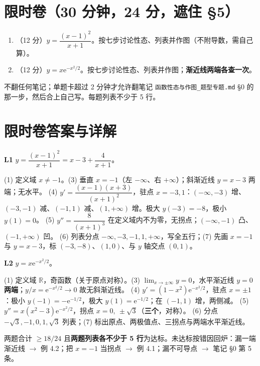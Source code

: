 \documentclass[11pt,a4paper]{ctexart}
\newcommand{\ee}{\mathrm{e}}
\begin{document}
\section{限时卷（30 分钟，24 分，遮住 \S 5）}

\begin{enumerate}[label=\textbf{L\arabic*.},leftmargin=2.4em,itemsep=10pt]
\item（12 分）$y=\dfrac{(x-1)^2}{x+1}$。按七步讨论性态、列表并作图（不附导数，需自己算）。
\item（12 分）$y=x\ee^{-x^2/2}$。按七步讨论性态、列表并作图；\textbf{渐近线两端各查一次}。
\end{enumerate}

\begin{warnbox}[掐表规则]
不翻任何笔记；单题卡超过 2 分钟才允许翻笔记 \texttt{函数性态与作图\_题型专题.md} \S 0 的那一步，然后合上自己写。每题列表不少于 5 行。
\end{warnbox}

\section{限时卷答案与详解}

\textbf{L1} $y=\dfrac{(x-1)^2}{x+1}=x-3+\dfrac4{x+1}$。

(1) 定义域 $x\ne-1$。(3) 垂直 $x=-1$（左 $-\infty$、右 $+\infty$）；斜渐近线 $y=x-3$ 两端；无水平。
(4) $y'=\dfrac{(x-1)(x+3)}{(x+1)^2}$，驻点 $x=-3,1$：$(-\infty,-3)$ 增、$(-3,-1)$ 减、$(-1,1)$ 减、$(1,+\infty)$ 增。极大 $y(-3)=-8$，极小 $y(1)=0$。
(5) $y''=\dfrac{8}{(x+1)^3}$ 在定义域内不为零，无拐点；$(-\infty,-1)$ 凸、$(-1,+\infty)$ 凹。
(6) 列表分点 $-\infty,-3,-1,1,+\infty$，写全五行；(7) 先画 $x=-1$ 与 $y=x-3$，标 $(-3,-8)$、$(1,0)$、与 $y$ 轴交点 $(0,1)$。

\textbf{L2} $y=x\ee^{-x^2/2}$。

(1) 定义域 $\mathbb{R}$，奇函数（关于原点对称）。(3) $\lim_{x\to\pm\infty}y=0$，水平渐近线 $y=0$ \textbf{两端}；$y/x=\ee^{-x^2/2}\to0$ 故无斜渐近线。
(4) $y'=(1-x^2)\ee^{-x^2/2}$，驻点 $x=\pm1$：极小 $y(-1)=-\ee^{-1/2}$，极大 $y(1)=\ee^{-1/2}$；在 $(-1,1)$ 增，两侧减。
(5) $y''=x(x^2-3)\ee^{-x^2/2}$，拐点 $x=0,\ \pm\sqrt3$（\textbf{三个}，对称）。
(6) 分点 $-\sqrt3,-1,0,1,\sqrt3$ 列表；(7) 标出原点、两极值点、三拐点与两端水平渐近线。

\begin{warnbox}[验收线]
两题合计 $\ge 18/24$ 且\textbf{两题列表各不少于 5 行}为达标。未达标按错因回炉：漏一端渐近线 $\to$ 例 4.2；把 $x=-1$ 当拐点 $\to$ 例 4.1；漏不可导点 $\to$ 笔记 \S 0 第 5 条。
\end{warnbox}
\end{document}
